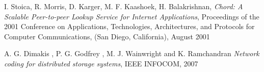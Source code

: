 \documentclass[journal]{IEEEtran}
\begin{document}




\begin{thebibliography}{1}


\bibitem{}
I. Stoica, R. Morris, D. Karger, M. F. Kaashoek, H. Balakrishnan, \emph{Chord: A Scalable Peer-to-peer Lookup Service for Internet Applications}, Proceedings of the 2001 Conference on Applications, Technologies, Architectures, and Protocols for Computer Communications, (San Diego, California), August 2001

\bibitem{}
A. G. Dimakis , P. G. Godfrey , M. J. Wainwright and K. Ramchandran  \emph{Network coding for distributed storage systems},  IEEE INFOCOM,  2007


\end{thebibliography}
\end{document}
